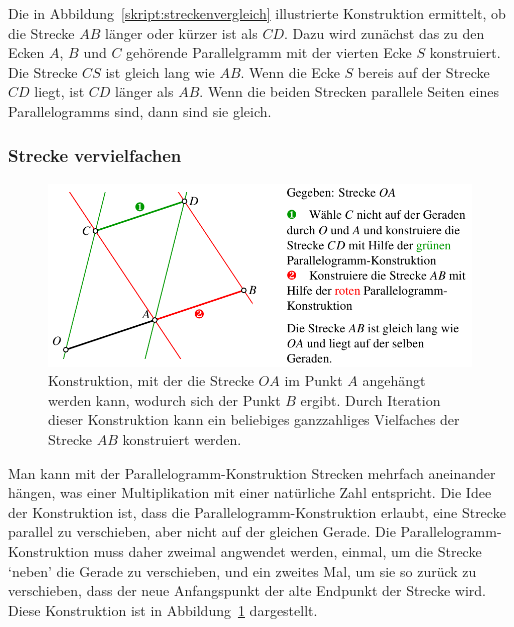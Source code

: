 Die in Abbildung~\ref{skript:streckenvergleich} illustrierte Konstruktion
ermittelt, ob die Strecke $AB$ länger oder kürzer ist als $CD$.
Dazu wird zunächst das zu den Ecken $A$, $B$ und $C$ gehörende Parallelgramm 
mit der vierten Ecke $S$ konstruiert.
Die Strecke $CS$ ist gleich lang wie $AB$.
Wenn die Ecke $S$ bereis auf der Strecke $CD$ liegt, ist $CD$ länger als $AB$.
Wenn die beiden Strecken parallele Seiten eines Parallelogramms sind, dann
sind sie gleich.

\subsubsection{Strecke vervielfachen}
\begin{figure}
\centering
\includegraphics{3/images/streckenvervielfachung.pdf}
\caption{Konstruktion, mit der die Strecke $OA$ im Punkt $A$ angehängt
werden kann, wodurch sich der Punkt $B$ ergibt.
Durch Iteration dieser Konstruktion kann ein beliebiges ganzzahliges
Vielfaches der Strecke $AB$ konstruiert werden.
\label{skript:streckenvervielfachung}}
\end{figure}
Man kann mit der Parallelogramm-Konstruktion Strecken mehrfach
aneinander hängen, was einer Multiplikation mit einer natürliche
Zahl entspricht.
Die Idee der Konstruktion ist, dass die Parallelogramm-Konstruktion
erlaubt, eine Strecke parallel zu verschieben, aber nicht auf der
gleichen Gerade.
Die Parallelogramm-Konstruktion muss daher zweimal angwendet werden,
einmal, um die Strecke `neben' die Gerade zu verschieben, und ein
zweites Mal, um sie so zurück zu verschieben, dass der neue Anfangspunkt
der alte Endpunkt der Strecke wird.
Diese Konstruktion ist in Abbildung~\ref{skript:streckenvervielfachung}
dargestellt.

